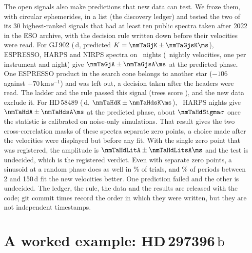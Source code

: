 The open signals also make predictions that new data can test. We froze them, with
circular ephemerides, in a list (the discovery ledger) and tested the two of its 30
highest-ranked signals that had at least ten public spectra taken after 2022 in the ESO
archive, with the decision rule written down before their velocities were read. For
GJ\,902 (\nmTaGjP\,d, predicted $K = \nmTaGjK \pm \nmTaGjsK\ms$), ESPRESSO, HARPS and NIRPS
spectra on \nmTaGjNights\ nights (\nmTaGjVel\ nightly velocities, one per instrument and night)
give $\nmTaGjA \pm \nmTaGjsA\ms$ at the predicted phase. One ESPRESSO product in the search
cone belongs to another star ($-106$ against $+70$\,km\,s$^{-1}$) and was left out, a
decision taken after the headers were read. The ladder and the rule passed this signal
(trees score \nmTaGjTree), and the new data exclude it. For HD\,58489 (\nmTaHdP\,d,
$\nmTaHdK \pm \nmTaHdsK\ms$), \nmTaHdNights\ HARPS nights give $\nmTaHdA \pm \nmTaHdsA\ms$ at the
predicted phase, about $\nmTaHdSigma\sigma$ once the statistic is calibrated on noise-only
simulations. That result gives the two cross-correlation masks of these spectra separate
zero points, a choice made after the velocities were displayed but before any fit. With
the single zero point that was registered, the amplitude is $\nmTaHdLitA \pm \nmTaHdLitsA\ms$
and the test is undecided, which is the registered verdict. Even with separate zero points,
a sinusoid at a random phase does as well in \nmTaHdPhase\% of trials, and \nmTaHdPer\% of
periods between 2 and 150\,d fit the new velocities better. One prediction failed and the
other is undecided. The ledger, the rule, the data and the results are released with the
code; git commit times record the order in which they were written, but they are not
independent timestamps.

\section{\texorpdfstring{A worked example: HD\,297396\,\ensuremath{\mathrm{b}}}{A worked example: HD 297396 b}}
\label{sec:example}

